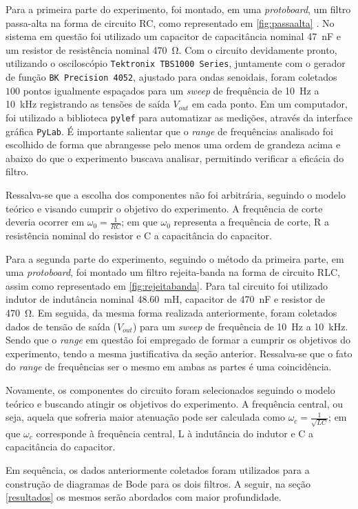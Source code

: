 Para a primeira parte do experimento, foi montado, em uma \textit{protoboard}, um filtro passa-alta na forma de  circuito RC, como representado em \cref{fig:passaalta} . No sistema em questão foi utilizado um capacitor de capacitância nominal \SI{47}{\nano\farad} e um resistor de resistência nominal \SI{470}{\ohm}. Com o circuito devidamente pronto, utilizando o osciloscópio \texttt{Tektronix TBS1000 Series}, juntamente com o gerador de função \texttt{BK Precision 4052}, ajustado para ondas senoidais, foram coletados $100$ pontos igualmente espaçados para um \textit{sweep} de frequência de \SI{10}{\hertz} a \SI{10}{\kilo\hertz} registrando as tensões de saída $V_{out}$ em cada ponto. Em um computador, foi utilizado a biblioteca \texttt{pylef}\cite{prog:pylef} para automatizar as medições, através da interface gráfica \texttt{PyLab}. É importante salientar que o \textit{range} de frequências analisado foi escolhido de forma que abrangesse pelo menos uma ordem de grandeza acima e abaixo do que o experimento buscava analisar, permitindo verificar a eficácia do filtro.

Ressalva-se que a escolha dos componentes não foi arbitrária, seguindo o modelo teórico e visando cumprir o objetivo do experimento. A frequência de corte deveria ocorrer em $\omega_0=\frac{1}{RC}$; em que $\omega_0$ representa a frequência de corte, R a resistência nominal do resistor e C a capacitância do capacitor.

Para a segunda parte do experimento, seguindo o método da primeira parte, em uma \textit{protoboard}, foi montado um filtro rejeita-banda na forma de circuito RLC, assim como representado em \ref{fig:rejeitabanda}. Para tal circuito foi utilizado indutor de indutância nominal \SI{48,60}{\milli\henry}, capacitor de \SI{470}{\nano\farad} e resistor de \SI{470}{\ohm}. Em seguida, da mesma forma realizada anteriormente, foram coletados dados de tensão de saída ($V_{out}$) para um \textit{sweep} de frequência de \SI{10}{\hertz} a \SI{10}{\kilo\hertz}. Sendo que o \textit{range} em questão foi empregado de formar a cumprir os objetivos do experimento, tendo a mesma justificativa da seção anterior. Ressalva-se que o fato do \textit{range} de frequências ser o mesmo em ambas as partes é uma coincidência.

Novamente, os componentes do circuito foram selecionados seguindo o modelo teórico e buscando atingir os objetivos do experimento. A frequência central, ou seja, aquela que sofreria maior atenuação pode ser calculada como $\omega_c=\frac{1}{\sqrt{LC}}$; em que $\omega_c$ corresponde à frequência central, L à indutância do indutor e C a capacitância do capacitor.

Em sequência, os dados anteriormente coletados foram utilizados para a construção de diagramas de Bode para os dois filtros. A seguir, na seção \ref{resultados} os mesmos serão abordados com maior profundidade.

